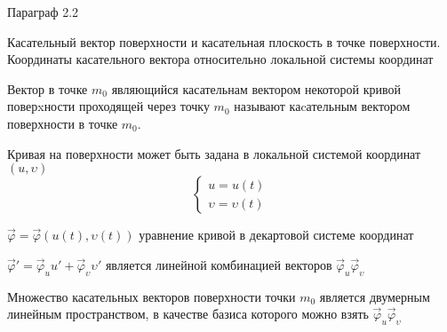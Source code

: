 \begin{title}[\Large]
  Параграф 2.2
\end{title}

\begin{title}[\Large]
  Касательный вектор поверхности и касательная плоскость в точке поверхности.
  Координаты касательного вектора относительно локальной системы координат
\end{title}

\begin{define}
  Вектор в точке $m_0$
  являющийся касательнам вектором некоторой кривой поверxности проходящей
  через точку $m_0$ называют каcательным вектором поверхности в точке $m_0$.

  Кривая на поверхности может быть задана в локальной системой координат
  $(u, \upsilon)$
  $$
  \left\{
    \begin{array}{l}
      u = u(t) \\
      \upsilon = \upsilon(t)
    \end{array}
  \right.
  $$

  $\vec \varphi = \vec \varphi(u(t), \upsilon(t))$ уравнение кривой в декартовой
  системе координат

  $\vec \varphi' = \vec \varphi_u u' + \vec \varphi_{\upsilon}
  \upsilon'$ является линейной комбинацией векторов $\vec \varphi_u
  \vec \varphi_{\upsilon}$
\end{define}

\begin{theorem}
  Множество касательных векторов поверхности точки $m_0$ является двумерным
  линейным пространством, в качестве базиса которого можно взять
  $\vec \varphi_u \vec \varphi_{\upsilon}$
\end{theorem}

